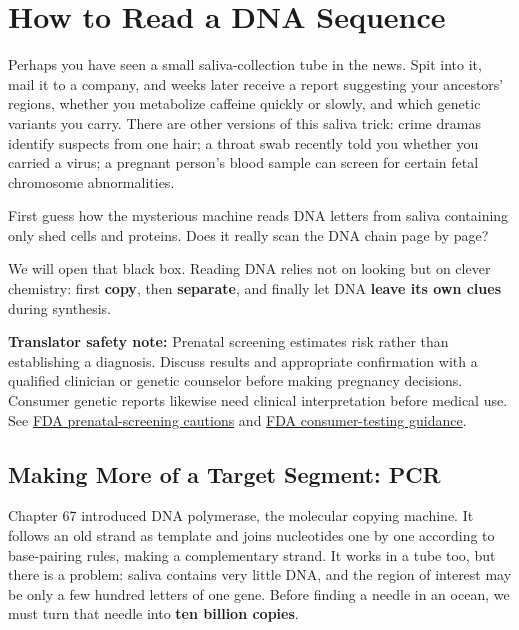 \chapter{How to Read a DNA Sequence}

\begin{kaichang}
Perhaps you have seen a small saliva-collection tube in the news. Spit into it, mail it to a company, and weeks later receive a report suggesting your ancestors' regions, whether you metabolize caffeine quickly or slowly, and which genetic variants you carry. There are other versions of this saliva trick: crime dramas identify suspects from one hair; a throat swab recently told you whether you carried a virus; a pregnant person's blood sample can screen for certain fetal chromosome abnormalities.

First guess how the mysterious machine reads DNA letters from saliva containing only shed cells and proteins. Does it really scan the DNA chain page by page?

We will open that black box. Reading DNA relies not on looking but on clever chemistry: first \textbf{copy}, then \textbf{separate}, and finally let DNA \textbf{leave its own clues} during synthesis.
\end{kaichang}

\textbf{Translator safety note:} Prenatal screening estimates risk rather than establishing a diagnosis. Discuss results and appropriate confirmation with a qualified clinician or genetic counselor before making pregnancy decisions. Consumer genetic reports likewise need clinical interpretation before medical use. See \href{https://content.govdelivery.com/accounts/USFDA/bulletins/3142524}{FDA prenatal-screening cautions} and \href{https://www.fda.gov/medical-devices/in-vitro-diagnostics/direct-consumer-tests}{FDA consumer-testing guidance}.

\section{Making More of a Target Segment: PCR}

Chapter 67 introduced DNA polymerase, the molecular copying machine. It follows an old strand as template and joins nucleotides one by one according to base-pairing rules, making a complementary strand. It works in a tube too, but there is a problem: saliva contains very little DNA, and the region of interest may be only a few hundred letters of one gene. Before finding a needle in an ocean, we must turn that needle into \textbf{ten billion copies}.


